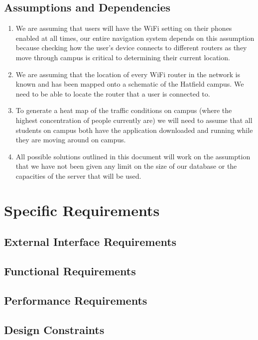\documentclass[a4paper,12pt]{article}
\begin{document}
\subsection{Assumptions and Dependencies}
\begin{enumerate}
\item We are assuming that users will have the WiFi setting on their phones enabled at all times, our entire navigation system depends on this assumption because checking how the user's device connects to different routers as they move through campus is critical to determining their current location. 
\item We are assuming that the location of every WiFi router in the network is known and has been mapped onto a schematic of the Hatfield campus. We need to be able to locate the router that a user is connected to.
\item To generate a heat map of the traffic conditions on campus (where the highest concentration of people currently are) we will need to assume that all students on campus both have the application downloaded and running while they are moving around on campus.
\item All possible solutions outlined in this document will work on the assumption that we have not been given any limit on the size of our database or the capacities of the server that will be used.
\end{enumerate}

\section{Specific Requirements}
\subsection{External Interface Requirements}

\subsection{Functional Requirements}

\subsection{Performance Requirements}

\subsection{Design Constraints}
\end{document}
